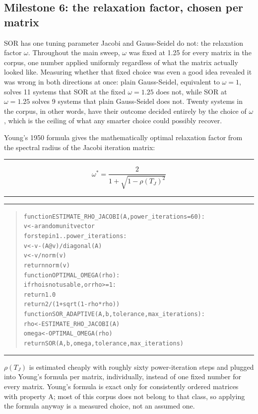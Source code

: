 \documentclass[11pt,a4paper]{article}
\newenvironment{formulabox}
  {\begin{center}\color{SBteal}\rule{0.92\linewidth}{0.8pt}\par\vspace{5pt}\color{SBnavy}}
  {\par\vspace{3pt}\color{SBteal}\rule{0.92\linewidth}{0.8pt}\end{center}}
\newenvironment{pseudobox}
  {\begin{center}\color{SBgold}\rule{0.92\linewidth}{0.8pt}\end{center}\vspace{-2pt}
   \begin{quote}\small\color{SBnavy}
   \begin{alltt}\ttfamily}
  {\end{alltt}\end{quote}\vspace{-6pt}\begin{center}\color{SBgold}\rule{0.92\linewidth}{0.8pt}\end{center}}
\begin{document}
\subsection{Milestone 6: the relaxation factor, chosen per matrix}
\label{sec:novel-omega}

SOR has one tuning parameter Jacobi and Gauss-Seidel do not: the relaxation factor
$\omega$. Throughout the main sweep, $\omega$ was fixed at 1.25 for every matrix in the
corpus, one number applied uniformly regardless of what the matrix actually looked like.
Measuring whether that fixed choice was even a good idea revealed it was wrong in both
directions at once: plain Gauss-Seidel, equivalent to $\omega=1$, solves 11 systems that
SOR at the fixed $\omega=1.25$ does not, while SOR at $\omega=1.25$ solves 9 systems that
plain Gauss-Seidel does not. Twenty systems in the corpus, in other words, have their
outcome decided entirely by the choice of $\omega$, which is the ceiling of what any
smarter choice could possibly recover.

Young's 1950 formula gives the mathematically optimal relaxation factor from the spectral
radius of the Jacobi iteration matrix:

\begin{formulabox}
$$\omega^{*} = \frac{2}{1+\sqrt{1-\rho(T_J)^2}}$$
\end{formulabox}

\begin{pseudobox}
function ESTIMATE_RHO_JACOBI(A, power_iterations = 60):
    v <- a random unit vector
    for step in 1 .. power_iterations:
        v <- v - (A @ v) / diagonal(A)
        v <- v / norm(v)
    return norm(v)
\vspace{5pt}
function OPTIMAL_OMEGA(rho):
    if rho is not usable, or rho >= 1:
        return 1.0
    return 2 / (1 + sqrt(1 - rho * rho))
\vspace{5pt}
function SOR_ADAPTIVE(A, b, tolerance, max_iterations):
    rho    <- ESTIMATE_RHO_JACOBI(A)
    omega  <- OPTIMAL_OMEGA(rho)
    return SOR(A, b, omega, tolerance, max_iterations)
\end{pseudobox}

$\rho(T_J)$ is estimated cheaply with roughly sixty power-iteration steps and plugged into
Young's formula per matrix, individually, instead of one fixed number for every matrix.
Young's formula is exact only for consistently ordered matrices with property A; most of
this corpus does not belong to that class, so applying the formula anyway is a measured
choice, not an assumed one.
\end{document}
